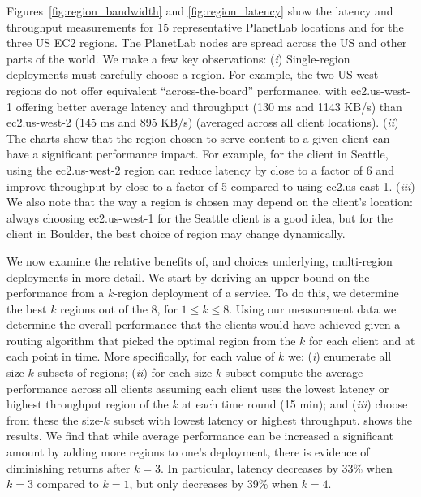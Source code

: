 Figures~\ref{fig:region_bandwidth} and \ref{fig:region_latency} show the
latency and throughput measurements for 15 representative PlanetLab
locations and for the three US EC2 regions. The PlanetLab nodes are spread
across the US and other parts of the world. 
We make a few key observations: ({\em i}) Single-region deployments must
carefully choose a region. For example, the two US west
regions do not offer equivalent ``across-the-board'' performance, with
ec2.us-west-1 offering better average latency and throughput (130 ms
and 1143 KB/s) than ec2.us-west-2 (145 ms and 895 KB/s)
(averaged across all client locations). ({\em ii}) The charts show that the
region chosen to serve content to a given client can have a
significant performance impact. For example, for the client in
Seattle, using the ec2.us-west-2 region can reduce latency by close to
a factor of 6 and improve throughput by close to a factor of 5
compared to using ec2.us-east-1. ({\em iii}) We also note that the way a
region is chosen may depend on the client's location: always choosing
ec2.us-west-1 for the Seattle client is a good idea, but for the
client in Boulder, the best choice of region may change
dynamically.

We now examine the relative benefits of, and choices underlying,
multi-region deployments in more detail. We start by deriving an upper
bound on the performance from a $k$-region deployment of a service. To
do this, we determine the best $k$ regions out of the 8, for $1 \le k
\le 8$.  Using our measurement data we determine the overall
performance that the clients would have achieved given a routing
algorithm that picked the optimal region from the $k$ for each client
and at each point in time. More specifically, for each value of $k$
we: ({\em i}) enumerate all size-$k$ subsets of regions; ({\em ii}) for each
size-$k$ subset compute the average performance across all clients
assuming each client uses the lowest latency or highest throughput
region of the $k$ at each time round (15 min); 
and ({\em iii}) choose from these the size-$k$ subset with lowest latency or
highest throughput.
 shows the results. We find that while average performance can be increased a
significant amount by adding more regions to one's deployment, there
is evidence of diminishing returns after $k=3$. In particular, latency
decreases by 33\% when $k=3$ compared to $k=1$, but only decreases by
39\% when $k=4$.

